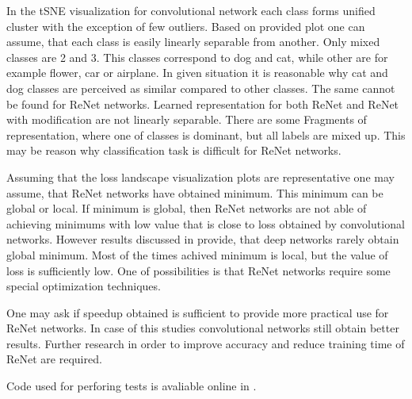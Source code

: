 \documentclass[a4paper, 10 pt, conference]{ieeeconf}
\begin{document}
In the tSNE visualization for convolutional network each class forms unified cluster with the exception of few outliers. Based on provided plot one can assume, that each class is easily linearly separable from another. Only mixed classes are 2 and 3. This classes correspond to dog and cat, while other are for example flower, car or airplane. In given situation it is reasonable why cat and dog classes are perceived as similar compared to other classes. The same cannot be found for ReNet networks. Learned representation for both ReNet and ReNet with modification are not linearly separable. There are some Fragments of representation, where one of classes is dominant, but all labels are mixed up. This may be reason why classification task is difficult for ReNet networks.

Assuming that the loss landscape visualization plots are representative one may assume, that ReNet networks have obtained minimum. This minimum can be global or local. If minimum is global, then ReNet networks are not able of achieving minimums with low value that is close to loss obtained by convolutional networks. However results discussed in \cite{Goodfellow-et-al-2016} provide, that deep networks rarely obtain global minimum. Most of the times achived minimum is local, but the value of loss is sufficiently low. One of possibilities is that ReNet networks require some special optimization techniques.

One may ask if speedup obtained is sufficient to provide more practical use for ReNet networks. In case of this studies convolutional networks still obtain better results. Further research in order to improve accuracy and reduce training time of ReNet are required.

Code used for perforing tests is avaliable online in \cite{repo}.




\end{document}
